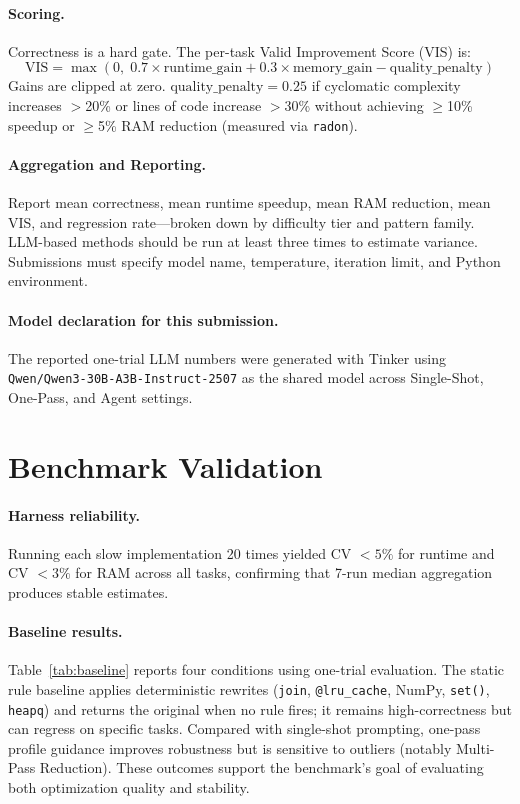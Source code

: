 \documentclass{article}
\begin{document}
\paragraph{Scoring.} Correctness is a hard gate. The per-task Valid Improvement Score (VIS) is:
\begin{equation}
\text{VIS} = \max\!\left(0,\; 0.7\times\text{runtime\_gain} + 0.3\times\text{memory\_gain} - \text{quality\_penalty}\right)
\end{equation}
Gains are clipped at zero. $\text{quality\_penalty}=0.25$ if cyclomatic complexity increases $>$20\% or lines of code increase $>$30\% without achieving $\geq$10\% speedup or $\geq$5\% RAM reduction (measured via \texttt{radon}).

\paragraph{Aggregation and Reporting.} Report mean correctness, mean runtime speedup, mean RAM reduction, mean VIS, and regression rate---broken down by difficulty tier and pattern family. LLM-based methods should be run at least three times to estimate variance. Submissions must specify model name, temperature, iteration limit, and Python environment.

\paragraph{Model declaration for this submission.} The reported one-trial LLM numbers were generated with Tinker using \texttt{Qwen/Qwen3-30B-A3B-Instruct-2507} as the shared model across Single-Shot, One-Pass, and Agent settings.

\section{Benchmark Validation}

\paragraph{Harness reliability.} Running each slow implementation 20 times yielded CV $<5\%$ for runtime and CV $<3\%$ for RAM across all tasks, confirming that 7-run median aggregation produces stable estimates.

\paragraph{Baseline results.} Table~\ref{tab:baseline} reports four conditions using one-trial evaluation. The static rule baseline applies deterministic rewrites (\texttt{join}, \texttt{@lru\_cache}, NumPy, \texttt{set()}, \texttt{heapq}) and returns the original when no rule fires; it remains high-correctness but can regress on specific tasks. Compared with single-shot prompting, one-pass profile guidance improves robustness but is sensitive to outliers (notably Multi-Pass Reduction). These outcomes support the benchmark's goal of evaluating both optimization quality and stability.
\end{document}
